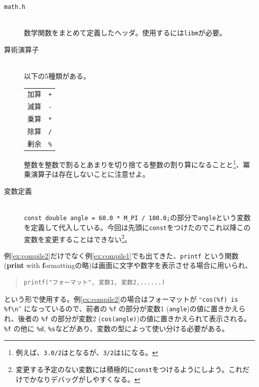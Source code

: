 \begin{description}
    \item[\texttt{math.h}] \mbox{}\\
          数学関数をまとめて定義したヘッダ。使用するには\texttt{libm}が必要。
    \item[算術演算子] \mbox{} \\
          以下の5種類がある。
          \begin{table}[H]
              \centering
              \begin{tabular}{ll}
                  加算 & \texttt{+}  \\
                  減算 & \texttt{-}  \\
                  乗算 & \texttt{*}  \\
                  除算 & \texttt{/}  \\
                  剰余 & \texttt{\%}
              \end{tabular}
          \end{table} \noindent
          整数を整数で割るとあまりを切り捨てる整数の割り算になることと\footnote{例えば、\texttt{3.0/2}はとなるが、\texttt{3/2}は\texttt{1}になる。}、冪乗演算子は存在しないことに注意せよ。
    \item[変数定義] \mbox{}\\
          \texttt{const double angle = 60.0 * M\_PI / 180.0;}の部分で\texttt{angle}という変数を定義して代入している。今回は先頭に\texttt{const}をつけたのでこれ以降この変数を変更することはできない\footnote{変更する予定のない変数には積極的に\texttt{const}をつけるようにしよう。これだけでかなりデバッグがしやすくなる。}。
\end{description}
例\ref{ex:compile2}だけでなく例\ref{ex:compile1}でも出てきた、\texttt{printf} という関数(\textbf{print} with \textbf{f}ormattingの略)は画面に文字や数字を表示させる場合に用いられ、
\begin{quote}
    \begin{verbatim}
printf("フォーマット", 変数1, 変数2,......)
\end{verbatim}
\end{quote}
という形で使用する。例\ref{ex:compile2}の場合はフォーマットが ``\texttt{cos(\%f) is \%f\textbackslash n}'' になっているので、前者の \texttt{\%f} の部分が変数1 (\texttt{angle})の値に置きかえられ、後者の \texttt{\%f} の部分が変数2 (\texttt{cos(angle)})の値に置きかえられて表示される。\texttt{\%f} の他に \texttt{\%d}, \texttt{\%s}などがあり、変数の型によって使い分ける必要がある。
